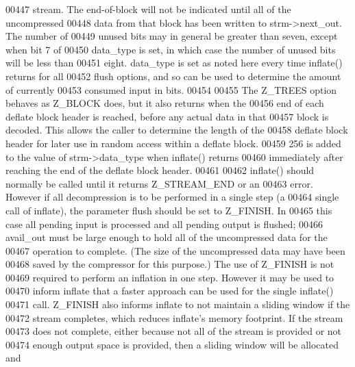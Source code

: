 \begin{DoxyCode}
00447 \textcolor{comment}{  stream.  The end-of-block will not be indicated until all of the uncompressed}
00448 \textcolor{comment}{  data from that block has been written to strm->next\_out.  The number of}
00449 \textcolor{comment}{  unused bits may in general be greater than seven, except when bit 7 of}
00450 \textcolor{comment}{  data\_type is set, in which case the number of unused bits will be less than}
00451 \textcolor{comment}{  eight.  data\_type is set as noted here every time inflate() returns for all}
00452 \textcolor{comment}{  flush options, and so can be used to determine the amount of currently}
00453 \textcolor{comment}{  consumed input in bits.}
00454 \textcolor{comment}{}
00455 \textcolor{comment}{    The Z\_TREES option behaves as Z\_BLOCK does, but it also returns when the}
00456 \textcolor{comment}{  end of each deflate block header is reached, before any actual data in that}
00457 \textcolor{comment}{  block is decoded.  This allows the caller to determine the length of the}
00458 \textcolor{comment}{  deflate block header for later use in random access within a deflate block.}
00459 \textcolor{comment}{  256 is added to the value of strm->data\_type when inflate() returns}
00460 \textcolor{comment}{  immediately after reaching the end of the deflate block header.}
00461 \textcolor{comment}{}
00462 \textcolor{comment}{    inflate() should normally be called until it returns Z\_STREAM\_END or an}
00463 \textcolor{comment}{  error.  However if all decompression is to be performed in a single step (a}
00464 \textcolor{comment}{  single call of inflate), the parameter flush should be set to Z\_FINISH.  In}
00465 \textcolor{comment}{  this case all pending input is processed and all pending output is flushed;}
00466 \textcolor{comment}{  avail\_out must be large enough to hold all of the uncompressed data for the}
00467 \textcolor{comment}{  operation to complete.  (The size of the uncompressed data may have been}
00468 \textcolor{comment}{  saved by the compressor for this purpose.)  The use of Z\_FINISH is not}
00469 \textcolor{comment}{  required to perform an inflation in one step.  However it may be used to}
00470 \textcolor{comment}{  inform inflate that a faster approach can be used for the single inflate()}
00471 \textcolor{comment}{  call.  Z\_FINISH also informs inflate to not maintain a sliding window if the}
00472 \textcolor{comment}{  stream completes, which reduces inflate's memory footprint.  If the stream}
00473 \textcolor{comment}{  does not complete, either because not all of the stream is provided or not}
00474 \textcolor{comment}{  enough output space is provided, then a sliding window will be allocated and}

\end{DoxyCode}
